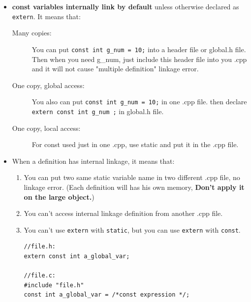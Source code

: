 \documentclass[a4paper,11pt,twoside]{book}
\begin{document}
\begin{itemize}
	\item \textbf{const variables internally link by default} unless otherwise declared as \texttt{extern}. It means that:
	

	\begin{description}
		\item[Many copies:] You can put \texttt{const int g\_num = 10;} into a header file or global.h file. Then when you need g\_num, just include this header file into you .cpp and it will not cause "multiple definition" linkage error. 
		
		\item[One copy, global access:] You also can put \texttt{const int g\_num = 10;} in one .cpp file. then declare \texttt{extern const int g\_num ;} in global.h file. 
		
		\item[One copy, local access:] For const used just in one .cpp, use static and put it in the .cpp file.
	\end{description}
	
	\item When a definition has internal linkage, it means that:
	\begin{enumerate}
		\item You can put two same static variable name in two different .cpp file, no linkage error. (Each definition will has his own memory, \textbf{Don't apply it on the large object.})
		
		\item You can't access internal linkage definition from another .cpp file. 
		
		\item You can't use \texttt{extern} with \texttt{static}, but you can use \texttt{extern} with \texttt{const}.
\begin{lstlisting}[numbers=none]
//file.h:
extern const int a_global_var;

//file.c:
#include "file.h"
const int a_global_var = /*const expression */;
\end{lstlisting}
\end{enumerate}


\end{itemize}
\end{document}
